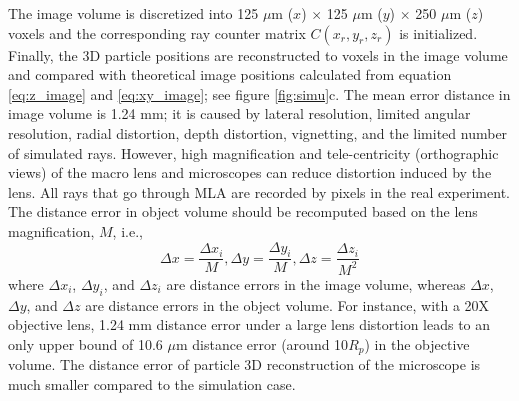 \documentclass[draftthesis,fullpage]{uiucthesis}
\begin{document}
The image volume is discretized into 125 $ \mu$m ($x$) $\times$ 125 $\mu$m ($y$) $\times$ 250 $\mu$m ($z$) voxels and the corresponding ray counter matrix $C(x_r,y_r,z_r)$ is initialized. Finally, the 3D particle positions are reconstructed to voxels in the image volume and compared with theoretical image positions calculated from equation \ref{eq:z_image} and \ref{eq:xy_image}; see figure \ref{fig:simu}c. The mean error distance in image volume is 1.24 mm; it is caused by lateral resolution, limited angular resolution, radial distortion, depth distortion, vignetting, and the limited number of simulated rays. However, high magnification and tele-centricity (orthographic views) of the macro lens and microscopes can reduce distortion induced by the lens. All rays that go through MLA are recorded by pixels in the real experiment. The distance error in object volume should be recomputed based on the lens magnification, $M$, i.e., 
\begin{equation}
  \Delta x = \frac{\Delta x_i}{M}, \Delta y = \frac{\Delta y_i}{M}, \Delta z = \frac{\Delta z_i}{M^2}
\label{eq:error}
\end{equation}
where $\Delta x_i$, $\Delta y_i$, and $\Delta z_i$ are distance errors in the image volume, whereas $\Delta x$, $\Delta y$, and $\Delta z$ are distance errors in the object volume. For instance, with a 20X objective lens, 1.24 mm distance error under a large lens distortion leads to an only upper bound of 10.6 $\mu$m distance error (around 10$R_p$) in the objective volume. The distance error of particle 3D reconstruction of the microscope is much smaller compared to the simulation case.
\end{document}
